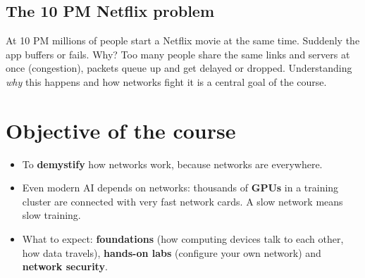 \begin{center}
\end{center}

\subsection{The 10 PM Netflix problem}
At 10 PM millions of people start a Netflix movie at the same time. Suddenly the app buffers or fails. Why? Too many people share the same links and servers at once (congestion), packets queue up and get delayed or dropped. Understanding \emph{why} this happens and how networks fight it is a central goal of the course.

\section{Objective of the course}
\begin{itemize}
  \item To \textbf{demystify} how networks work, because networks are everywhere.
  \item Even modern AI depends on networks: thousands of \textbf{GPUs} in a training cluster are connected with very fast network cards. A slow network means slow training.
  \item What to expect: \textbf{foundations} (how computing devices talk to each other, how data travels), \textbf{hands-on labs} (configure your own network) and \textbf{network security}.
\end{itemize}

